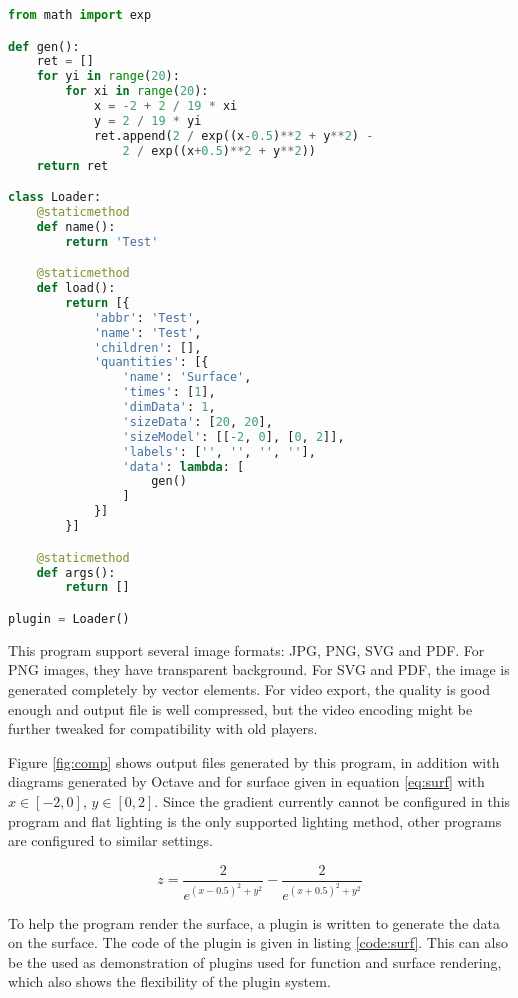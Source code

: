 \begin{lstfloat}[!tb]
	\begin{lstlisting}[language = python, style = mybase, label = code:surf,
	caption = Plugin to generate the surface]
from math import exp

def gen():
	ret = []
	for yi in range(20):
		for xi in range(20):
			x = -2 + 2 / 19 * xi
			y = 2 / 19 * yi
			ret.append(2 / exp((x-0.5)**2 + y**2) - 
				2 / exp((x+0.5)**2 + y**2))
	return ret

class Loader:
	@staticmethod
	def name():
		return 'Test'

	@staticmethod
	def load():
		return [{
			'abbr': 'Test',
			'name': 'Test',
			'children': [],
			'quantities': [{
				'name': 'Surface',
				'times': [1],
				'dimData': 1,
				'sizeData': [20, 20],
				'sizeModel': [[-2, 0], [0, 2]],
				'labels': ['', '', '', ''],
				'data': lambda: [
					gen()
				]
			}]
		}]

	@staticmethod
	def args():
		return []

plugin = Loader()
\end{lstlisting}
\end{lstfloat}

This program support several image formats: JPG, PNG, SVG and PDF. For PNG images, they have transparent background. For SVG and PDF, the image is generated completely by vector elements. For video export, the quality is good enough and output file is well compressed, but the video encoding might be further tweaked for compatibility with old players.

Figure \ref{fig:comp} shows output files generated by this program, in addition with diagrams generated by Octave and \MatLab{} for surface given in equation \ref{eq:surf} with $x\in[-2, 0]$, $y \in [0, 2]$. Since the gradient currently cannot be configured in this program and flat lighting is the only supported lighting method, other programs are configured to similar settings.

\begin{equation} \label{eq:surf}
	z = \frac{2}{e^{(x - 0.5)^2 + y^2}} - \frac{2}{e^{(x + 0.5)^2 + y^2}}
\end{equation}

To help the program render the surface, a plugin is written to generate the data on the surface. The code of the plugin is given in listing \ref{code:surf}. This can also be the used as demonstration of plugins used for function and surface rendering, which also shows the flexibility of the plugin system.

